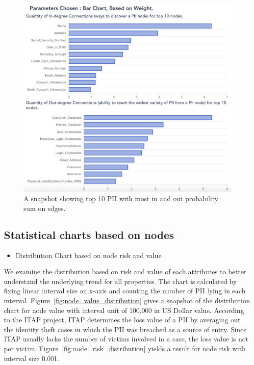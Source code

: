 \documentclass[conference]{IEEEtran}
\begin{document}
\begin{figure}[ht!]
  \includegraphics[width=\linewidth]{barchart_most_weight.png}
  \caption{A snapshot showing top 10 PII with most in and out probability sum on edges.}
  \label{fig:barchart_most_weight}
\end{figure}

\subsection{Statistical charts based on nodes}
\begin{itemize}
\item Distribution Chart based on node risk and value
\end{itemize}

We examine the distribution based on risk and value of each attributes to better understand the underlying trend for all properties. The chart is calculated by fixing linear interval size on x-axis and counting the number of PII lying in each interval. Figure~\ref{fig:node_value_distribution} gives a snapshot of the distribution chart for node value with interval unit of 100,000 in US Dollar value. According to the ITAP project\cite{ITAPDataSource}, ITAP determines the loss value of a PII  by averaging out the identity theft cases in which the PII was breached as a source of entry. Since ITAP usually lacks the number of victims involved in a case, the loss value is not per victim. Figure~\ref{fig:node_risk_distribution} yields a result for node risk with interval size 0.001.
\end{document}
